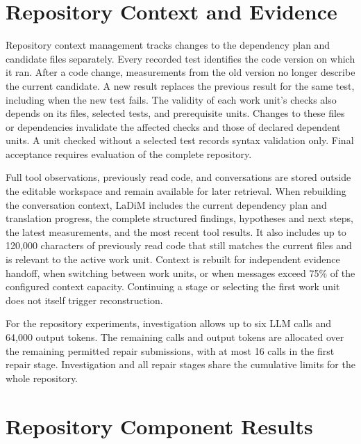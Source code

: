 \documentclass{article}
\begin{document}
\section{Repository Context and Evidence}
\label{sec:repository-context}
Repository context management tracks changes to the dependency plan and candidate files separately. Every recorded test identifies the code version on which it ran. After a code change, measurements from the old version no longer describe the current candidate. A new result replaces the previous result for the same test, including when the new test fails. The validity of each work unit's checks also depends on its files, selected tests, and prerequisite units. Changes to these files or dependencies invalidate the affected checks and those of declared dependent units. A unit checked without a selected test records syntax validation only. Final acceptance requires evaluation of the complete repository.

Full tool observations, previously read code, and conversations are stored outside the editable workspace and remain available for later retrieval. When rebuilding the conversation context, LaDiM includes the current dependency plan and translation progress, the complete structured findings, hypotheses and next steps, the latest measurements, and the most recent tool results. It also includes up to 120,000 characters of previously read code that still matches the current files and is relevant to the active work unit. Context is rebuilt for independent evidence handoff, when switching between work units, or when messages exceed 75\% of the configured context capacity. Continuing a stage or selecting the first work unit does not itself trigger reconstruction.

For the repository experiments, investigation allows up to six LLM calls and 64,000 output tokens. The remaining calls and output tokens are allocated over the remaining permitted repair submissions, with at most 16 calls in the first repair stage. Investigation and all repair stages share the cumulative limits for the whole repository.

\section{Repository Component Results}
\label{sec:repository-component-results}
\end{document}
